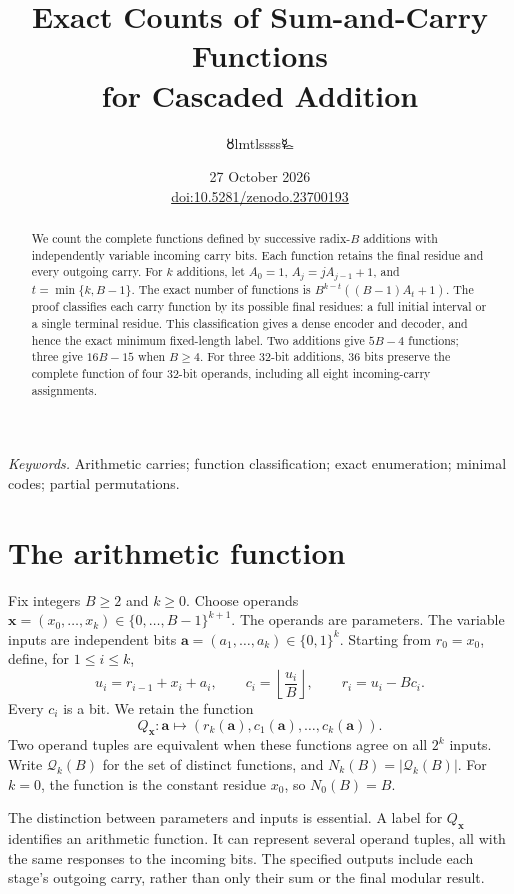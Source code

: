 \documentclass[11pt,a4paper]{article}
\title{\LARGE Exact Counts of Sum-and-Carry Functions\\for Cascaded Addition}
\author{{\authorsymbol 🜘}lmtlssss{\authorsymbol 🜐}}
\date{27 October 2026\\[3pt]{\small\href{https://doi.org/10.5281/zenodo.23700193}{doi:10.5281/zenodo.23700193}}}
\theoremstyle{definition}\newtheorem{definition}[theorem]{Definition}
\newcommand{\Q}{\mathcal Q}
\newcommand{\abits}{\boldsymbol a}
\newcommand{\xvec}{\boldsymbol x}
\begin{document}
\maketitle\thispagestyle{plain}
\begin{abstract}
We count the complete functions defined by successive radix-$B$ additions
with independently variable incoming carry bits. Each function retains the
final residue and every outgoing carry. For $k$ additions, let
$A_0=1$, $A_j=jA_{j-1}+1$, and $t=\min\{k,B-1\}$.
The exact number of functions is
$B^{k-t}((B-1)A_t+1)$.
The proof classifies each carry function by its possible final residues:
a full initial interval or a single terminal residue.
This classification gives a dense encoder and decoder, and hence the exact
minimum fixed-length label. Two additions give $5B-4$ functions; three give
$16B-15$ when $B\geq4$.
For three 32-bit additions, 36 bits preserve the complete function of four
32-bit operands, including all eight incoming-carry assignments.
\end{abstract}
\noindent\textit{Keywords.} Arithmetic carries; function classification;
exact enumeration; minimal codes; partial permutations.

\section{The arithmetic function}
Fix integers $B\geq2$ and $k\geq0$. Choose operands
$\xvec=(x_0,\ldots,x_k)\in\{0,\ldots,B-1\}^{k+1}$.
The operands are parameters. The variable inputs are independent bits
$\abits=(a_1,\ldots,a_k)\in\{0,1\}^k$.
Starting from $r_0=x_0$, define, for $1\leq i\leq k$,
\begin{equation}\label{eq:operation}
 u_i=r_{i-1}+x_i+a_i,\qquad
 c_i=\left\lfloor\frac{u_i}{B}\right\rfloor,\qquad
 r_i=u_i-Bc_i.
\end{equation}
Every $c_i$ is a bit. We retain the function
\begin{equation}\label{eq:function}
 Q_{\xvec}:\abits\longmapsto
      (r_k(\abits),c_1(\abits),\ldots,c_k(\abits)).
\end{equation}
Two operand tuples are equivalent when these functions agree on all
$2^k$ inputs. Write $\Q_k(B)$ for the set of distinct functions, and
$N_k(B)=|\Q_k(B)|$. For $k=0$, the function is the constant residue $x_0$,
so $N_0(B)=B$.

The distinction between parameters and inputs is essential. A label for
$Q_{\xvec}$ identifies an arithmetic function. It can represent several
operand tuples, all with the same responses to the incoming bits.
The specified outputs include each stage's outgoing carry, rather than only
their sum or the final modular result.
\end{document}
